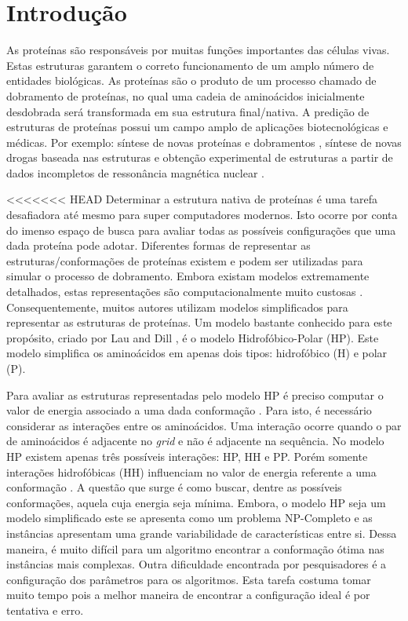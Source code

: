 \chapter{Introdução}

As proteínas são responsáveis por muitas funções importantes das células vivas. Estas estruturas garantem o correto funcionamento de um amplo número de entidades biológicas. As proteínas são o produto de um processo chamado de dobramento de proteínas, no qual uma cadeia de aminoácidos inicialmente desdobrada será transformada em sua estrutura final/nativa. A predição de estruturas de proteínas possui um campo amplo de aplicações biotecnológicas e médicas. Por exemplo: síntese de novas proteínas e dobramentos \cite{wang2012structural, rothlisberger2008kemp}, síntese de novas drogas baseada nas estruturas \cite{qian2004improvement, krieger2009improving}  e obtenção experimental de estruturas a partir de dados incompletos de ressonância magnética nuclear \cite{shen2009novo}.  

<<<<<<< HEAD
	Determinar a estrutura nativa de proteínas é uma tarefa desafiadora até mesmo para super computadores modernos. Isto ocorre por conta do imenso espaço de busca para avaliar todas as possíveis configurações que uma dada proteína pode adotar. Diferentes formas de representar as estruturas/conformações de proteínas existem e podem ser utilizadas para simular o processo de dobramento. Embora existam modelos extremamente detalhados, estas representações são computacionalmente muito custosas \cite{benitez2015algoritmo, santana2008protein}. Consequentemente, muitos autores \cite{custodio2004investigation,hsu2003growth,lin2011protein,unger1993genetic,santana2008protein,custodio2014multiple, garza2012locality} utilizam modelos simplificados para representar as estruturas de proteínas. Um modelo bastante conhecido para este propósito, criado por Lau and Dill \cite{lau1989lattice}, é o modelo Hidrofóbico-Polar (HP). Este modelo simplifica os aminoácidos em apenas dois tipos: hidrofóbico (H) e polar (P). 

Para avaliar as estruturas representadas pelo modelo HP é preciso computar o valor de energia associado a uma dada conformação \cite{unger1993genetic}. Para isto, é necessário considerar as interações entre os aminoácidos. Uma interação ocorre quando o par de aminoácidos é adjacente no \textit{grid} e não é adjacente na sequência. No modelo HP existem apenas três possíveis interações: HP, HH e PP. Porém somente interações hidrofóbicas (HH) influenciam no valor de energia referente a uma conformação \cite{unger1993genetic}. A questão que surge é como buscar, dentre as possíveis conformações, aquela cuja energia seja mínima. Embora, o modelo HP seja um modelo simplificado este se apresenta como um problema NP-Completo e as instâncias apresentam uma grande variabilidade de características entre si. Dessa maneira, é muito difícil para um algoritmo encontrar a conformação ótima nas instâncias mais complexas. Outra dificuldade encontrada por pesquisadores é a configuração dos parâmetros para os algoritmos. Esta tarefa costuma tomar muito tempo pois a melhor maneira de encontrar a configuração ideal é por tentativa e erro.

